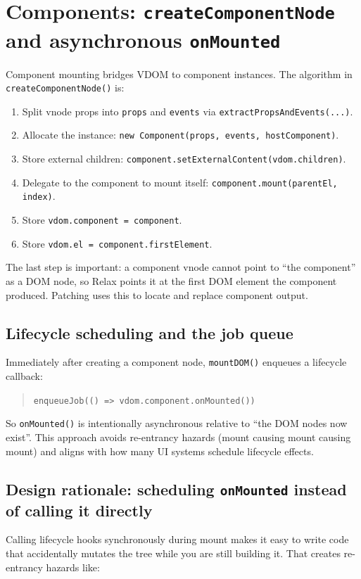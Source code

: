 \section{Components: \texttt{createComponentNode} and asynchronous \texttt{onMounted}}
Component mounting bridges VDOM to component instances.
The algorithm in \texttt{createComponentNode()} is:

\begin{enumerate}
  \item Split vnode props into \texttt{props} and \texttt{events} via \texttt{extractPropsAndEvents(...)}.
  \item Allocate the instance: \texttt{new Component(props, events, hostComponent)}.
  \item Store external children: \texttt{component.setExternalContent(vdom.children)}.
  \item Delegate to the component to mount itself: \texttt{component.mount(parentEl, index)}.
  \item Store \texttt{vdom.component = component}.
  \item Store \texttt{vdom.el = component.firstElement}.
\end{enumerate}

The last step is important: a component vnode cannot point to ``the component'' as a DOM node, so Relax points it at the first DOM element the component produced. Patching uses this to locate and replace component output.

\subsection{Lifecycle scheduling and the job queue}
Immediately after creating a component node, \texttt{mountDOM()} enqueues a lifecycle callback:

\begin{quote}
  	\texttt{enqueueJob(() => vdom.component.onMounted())}
\end{quote}

So \texttt{onMounted()} is intentionally asynchronous relative to ``the DOM nodes now exist''.
This approach avoids re-entrancy hazards (mount causing mount causing mount) and aligns with how many UI systems schedule lifecycle effects.

\subsection*{Design rationale: scheduling \texttt{onMounted} instead of calling it directly}
Calling lifecycle hooks synchronously during mount makes it easy to write code that accidentally mutates the tree while you are still building it.
That creates re-entrancy hazards like:

